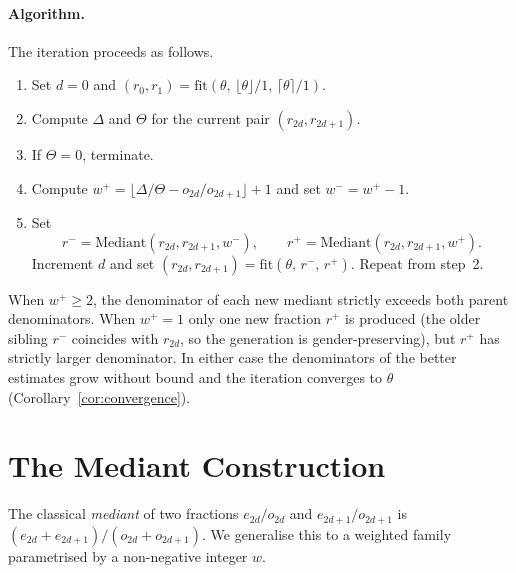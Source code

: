 \documentclass[12pt]{article}
\theoremstyle{definition}
\theoremstyle{remark}
\theoremstyle{plain}
\newcommand{\Kval}{\Theta}
\newcommand{\Dval}{\Delta}
\newcommand{\wplus}{w^{+}}
\newcommand{\wminus}{w^{-}}
\begin{document}
\paragraph{Algorithm.}
The iteration proceeds as follows.
\begin{enumerate}
  \item Set $d = 0$ and $(r_0, r_1) = \mathrm{fit}(\theta,\, \lfloor\theta\rfloor/1,\, \lceil\theta\rceil/1)$.
  \item Compute $\Dval$ and $\Kval$ for the current pair $(r_{2d}, r_{2d+1})$.
  \item If $\Kval = 0$, terminate.
  \item Compute $\wplus = \lfloor \Dval/\Kval - o_{2d}/o_{2d+1} \rfloor + 1$ and set $\wminus = \wplus - 1$.
  \item Set
    \[
      r^- = \mathrm{Mediant}(r_{2d}, r_{2d+1}, \wminus), \qquad
      r^+ = \mathrm{Mediant}(r_{2d}, r_{2d+1}, \wplus).
    \]
    Increment $d$ and set $(r_{2d}, r_{2d+1}) = \mathrm{fit}(\theta,\, r^-,\, r^+)$.
    Repeat from step~2.
\end{enumerate}
When $w^+ \geq 2$, the denominator of each new mediant strictly exceeds both
parent denominators.
When $w^+ = 1$ only one new fraction $r^+$ is produced (the older sibling
$r^-$ coincides with $r_{2d}$, so the generation is gender-preserving),
but $r^+$ has strictly larger denominator.
In either case the denominators of the better estimates grow without bound and
the iteration converges to $\theta$ (Corollary~\ref{cor:convergence}).

\section{The Mediant Construction}
\label{sec:mediant}

The classical \emph{mediant} of two fractions $e_{2d}/o_{2d}$ and $e_{2d+1}/o_{2d+1}$ is
$(e_{2d} + e_{2d+1})/(o_{2d} + o_{2d+1})$.
We generalise this to a weighted family parametrised by a non-negative integer $w$.
\end{document}
